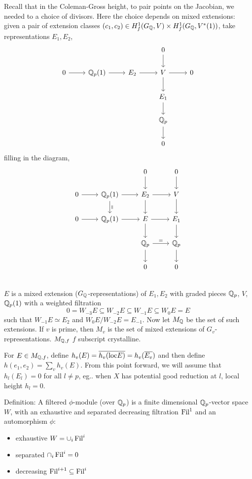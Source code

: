 Recall that in the Coleman-Gross height, to pair points on the Jacobian, we needed to a choice of divisors. Here the choice depends on mixed extensions: given a pair of extension classes $(c_1,c_2) \in H_f^1(G_{\mathbb{Q}},V) \times H_f^1(G_{\mathbb{Q}}, V^*(1))$, take representations $E_1,E_2$,
	\[
	\begin{tikzcd}
	&&&  0 \arrow{d} \\
	0 \arrow{r} & \Qp(1) \arrow{r} & E_2 \arrow{r} & V \arrow{r} \arrow{d} & 0 \\
	&&& E_1 \arrow{d} \\
	&&& \Qp \arrow{d} \\
	&&& 0
	\end{tikzcd}
	\]
filling in the diagram,
	\[
	\begin{tikzcd}
	& & 0 \arrow{d} & 0 \arrow{d} \\
	0 \arrow{r} & \Qp(1) \arrow{r} \arrow{d}{\rotatebox{90}{$=$}} &  E_2 \arrow{r} \arrow{d} & V \arrow{d} \\
	0 \arrow{r} & \Qp(1) \arrow{r} &  E \arrow{r} \arrow{d} & E_1 \arrow{d} \\
	& & \Qp \arrow{r}{=} \arrow{d} & \Qp \arrow{d} \\
	& & 0 & 0 \\
	\end{tikzcd}
	\]
$E$ is a mixed extension ($G_{\mathbb{Q}}$-representations) of $E_1,E_2$ with graded pieces $\mathbb{Q}_p$, $V$, $\mathbb{Q}_p(1)$ with a weighted filtration 
	\[
	0= W_{-3}E \subseteq W_{-2} E \subseteq W_{-1} E \subseteq W_0 E= E
	\] 
such that $W_{-1} E \simeq E_2$ and $W_0 E/W_{-2}E= E_{-1}$. Now let $M_{\mathbb{Q}}$ be the set of such extensions. If $v$ is prime, then $M_v$ is the set of mixed extensions of $G_v$-representations. $M_{\mathbb{Q},f}$ $f$ subscript crystalline. 


For $E \in M_{\mathbb{Q},f}$, define $h_v(E)= \overline{h_v(\text{loc} E)}= h_v(\overline{E_v})$ and then define $h(e_1,e_2)= \sum_v h_v(E)$. From this point forward, we will assume that $h_l(E_l)= 0$ for all $l \neq p$, eg.. when $X$ has potential good reduction at $l$, local height $h_l= 0$.


Definition: A filtered $\phi$-module (over $\mathbb{Q}_p$) is a finite dimensional $\mathbb{Q}_p$-vector space $W$, with an exhaustive and separated decreasing filtration $\operatorname{Fil}^1$ and an automorphism $\phi$:

\begin{itemize}
\item exhaustive $W= \cup_i \operatorname{Fil}^i$
\item separated $\cap_i \operatorname{Fil}^i= 0$
\item decreasing $\operatorname{Fil}^{i+1} \subseteq \operatorname{Fil}^i$
\end{itemize}


